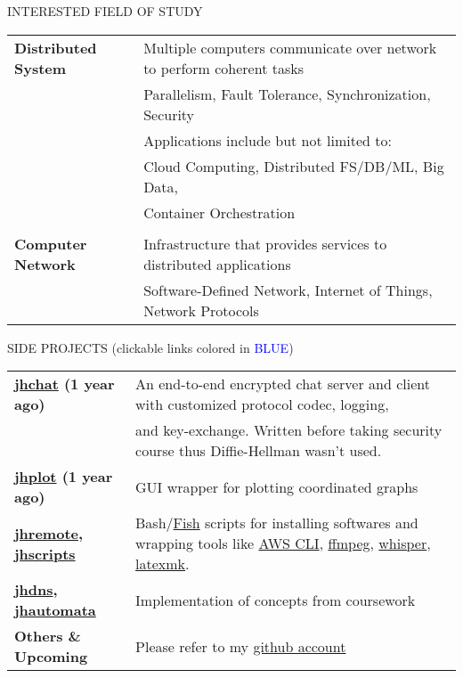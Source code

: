 \documentclass{resume} %
\begin{document}
\begin{rSection}{INTERESTED FIELD OF STUDY}

\begin{tabular}{ @{} >{\bfseries}l @{\hspace{6ex}} l }
Distributed System & Multiple computers communicate over network to perform coherent tasks \\
                   & Parallelism, Fault Tolerance, Synchronization, Security \\
                   & Applications include but not limited to: \\
                   & Cloud Computing, Distributed FS/DB/ML, Big Data, \\
                   & Container Orchestration \\ \\
Computer Network   & Infrastructure that provides services to distributed applications \\
                   & Software-Defined Network, Internet of Things, Network Protocols \\
\end{tabular}

\end{rSection}


\begin{rSection}{SIDE PROJECTS (clickable links colored in \textcolor{blue}{BLUE})}

\begin{tabular}{ @{} >{\bfseries}l @{\hspace{6ex}} l }
\href{https://github.com/realzhujunhao/jhchat}{jhchat}
(1 year ago) & An end-to-end encrypted chat server and client with
                      customized protocol codec, logging, \\ 
                    & and key-exchange. Written before taking security course thus Diffie-Hellman wasn't used. \\
\href{https://github.com/realzhujunhao/jhplot}{jhplot}
(1 year ago) & GUI wrapper for plotting coordinated graphs \\
\href{https://github.com/realzhujunhao/jhremote}{jhremote},
\href{https://github.com/realzhujunhao/jhscripts}{jhscripts}
& Bash/\href{https://fishshell.com/}{Fish} scripts for installing softwares and wrapping tools like
\href{https://aws.amazon.com/cli/}{AWS CLI},
\href{https://github.com/FFmpeg/FFmpeg}{ffmpeg}, 
\href{https://github.com/openai/whisper}{whisper}, 
\href{https://mg.readthedocs.io/latexmk.html}{latexmk}. \\
\href{https://github.com/realzhujunhao/jhdns}{jhdns},
\href{https://github.com/realzhujunhao/jhautomata}{jhautomata}
& Implementation of concepts from coursework \\
Others \& Upcoming & Please refer to my \href{https://github.com/realzhujunhao}{github account}
\end{tabular}

\end{rSection} 
\end{document}
